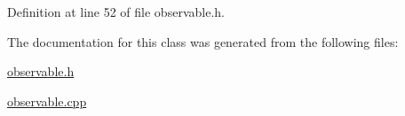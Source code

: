 Definition at line 52 of file observable.\+h.



The documentation for this class was generated from the following files\+:\begin{DoxyCompactItemize}
\item 
\hyperlink{observable_8h}{observable.\+h}\item 
\hyperlink{observable_8cpp}{observable.\+cpp}\end{DoxyCompactItemize}
